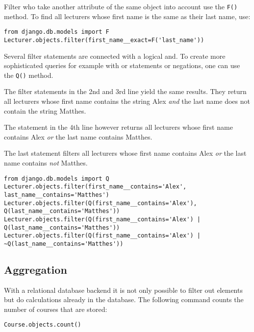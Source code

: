 Filter who take another attribute of the same object into account use the \lstinline|F()| method. To find all lecturers whose first name is the same as their last name, use:
\begin{lstlisting}[style=Python, caption=Filtering objects with attribute comparisons, label=lst:filtering_objects_attributes]
from django.db.models import F
Lecturer.objects.filter(first_name__exact=F('last_name'))
\end{lstlisting}

Several filter statements are connected with a logical and. To create more sophisticated queries for example with or statements or negations, one can use the \lstinline|Q()| method.

The filter statements in the 2nd and 3rd line yield the same results. They return all lecturers whose first name contains the string Alex \emph{and} the last name does not contain the string Matthes.

The statement in the 4th line however returns all lecturers whose first name contains Alex \emph{or} the last name contains Matthes.

The last statement filters all lecturers whose first name contains Alex \emph{or} the last name contains \emph{not} Matthes.

\begin{lstlisting}[style=Python, caption=Filtering objects with or statements and negations, label=lst:filtering_objects_or]
from django.db.models import Q
Lecturer.objects.filter(first_name__contains='Alex', last_name__contains='Matthes')
Lecturer.objects.filter(Q(first_name__contains='Alex'), Q(last_name__contains='Matthes'))
Lecturer.objects.filter(Q(first_name__contains='Alex') | Q(last_name__contains='Matthes'))
Lecturer.objects.filter(Q(first_name__contains='Alex') | ~Q(last_name__contains='Matthes'))
\end{lstlisting}

\subsection{Aggregation}

With a relational database backend it is not only possible to filter out elements but do calculations already in the database. The following command counts the number of courses that are stored:
\begin{lstlisting}[style=Python, caption=Counting objects, label=lst:counting_objects]
Course.objects.count()
\end{lstlisting}

